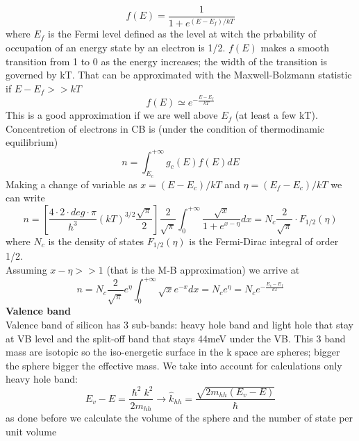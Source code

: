 \begin{equation}
f(E)=\frac{1}{1+e^{(E-E_f)/kT}}
\end{equation}
where $E_f$ is the Fermi level defined as the level at witch the prbability of occupation of an energy state by an electron is 1/2. $f(E)$ makes a smooth transition from 1 to 0 as the energy increases; the width of the transition is governed by kT.
That can be approximated with the Maxwell-Bolzmann statistic if $E-E_f>>kT$ 
\begin{equation}
f(E)\simeq e^{-\frac{E-E_f}{kT}}
\end{equation}
This is a good approximation if we are well above $E_f$ (at least a few kT).\\
Concentretion of electrons in CB is (under the condition of thermodinamic equilibrium)
\begin{equation}
n=\int^{+\infty}_{E_c} g_c(E)f(E)dE
\end{equation}
Making a change of variable as $x=(E-E_c)/kT$ and $\eta=(E_f-E_c)/kT$ we can write
\begin{equation}
n=\left[\frac{4\cdot 2\cdot deg \cdot \pi}{h^3}(kT)^{3/2}\frac{\sqrt{\pi}}{2}\right]\frac{2}{\sqrt{\pi}}\int^{+\infty}_0 \frac{\sqrt{x}}{1+e^{x-\eta}}dx=N_c \frac{2}{\sqrt{\pi}}\cdot F_{1/2}(\eta)
\end{equation}  
where $N_c$ is the density of states $F_{1/2}(\eta)$ is the Fermi-Dirac integral of order 1/2.\\
Assuming $x-\eta>>1$ (that is the M-B approximation) we arrive at 
\begin{equation}
n=N_c\frac{2}{\sqrt{\pi}}e^\eta \int^{+\infty}_0\sqrt{x}e^{-x}dx=N_ce^\eta=N_c e^{-\frac{E_c-E_f}{kT}}
\end{equation}
\newline
{\bf Valence band}\\
Valence band of silicon has 3 sub-bands: heavy hole band and light hole that stay at VB level and the split-off band that stays 44meV under the VB. This 3 band mass are isotopic so the iso-energetic surface in the k space are spheres; bigger the sphere bigger the effective mass. We take into account for calculations only heavy hole band: 
\begin{equation}
E_v-E=\frac{\hslash^2 k^2}{2m_{hh}}\rightarrow\hat{k}_{hh}=\frac{\sqrt{2m_{hh}(E_v-E)}}{\hslash}
\end{equation} 
as done before we calculate the volume of the sphere and the number of state per unit volume

